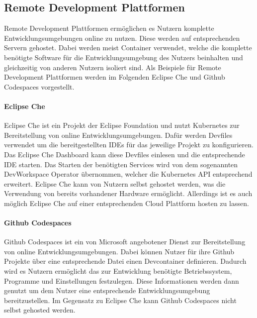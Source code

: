 \subsection{Remote Development Plattformen}\label{section:stand-der-technik:weitere-entwicklungen:remote-development-plattformen}

Remote Development Plattformen ermöglichen es Nutzern komplette Entwicklungsumgebungen online zu nutzen. Diese werden auf entsprechenden Servern gehostet. Dabei werden meist Container verwendet, welche die komplette benötigte Software für die Entwicklungsumgebung des Nutzers beinhalten und gleichzeitig von anderen Nutzern isoliert sind. Als Beispiele für Remote Development Plattformen werden im Folgenden Eclipse Che \cite{noauthor_eclipse-che_nodate} und Github Codespaces \cite{noauthor_github-codespaces_2024} vorgestellt.

\paragraph{Eclipse Che}
Eclipse Che \cite{noauthor_eclipse-che_nodate} ist ein Projekt der Eclipse Foundation \cite{milinkovich_eclipse-foundation_nodate} und nutzt Kubernetes \cite{noauthor_kubernetes_nodate} zur Bereitstellung von online Entwicklungsumgebungen. Dafür werden Devfiles \cite{noauthor_devfile_nodate} verwendet um die bereitgestellten IDEs für das jeweilige Projekt zu konfigurieren. Das Eclipse Che Dashboard kann diese Devfiles einlesen und die entsprechende IDE starten. Das Starten der benötigten Services wird von dem sogenannten DevWorkspace Operator übernommen, welcher die Kubernetes API entsprechend erweitert. Eclipse Che kann von Nutzern selbst gehostet werden, was die Verwendung von bereits vorhandener Hardware ermöglicht. Allerdings ist es auch möglich Eclipse Che auf einer entsprechenden Cloud Plattform hosten zu lassen.

\paragraph{Github Codespaces}
Github Codespaces \cite{noauthor_github-codespaces_2024} ist ein von Microsoft \cite{noauthor_microsoft_nodate} angebotener Dienst zur Bereitstellung von online Entwicklungsumgebungen. Dabei können Nutzer für ihre Github Projekte über eine entsprechende Datei einen Devcontainer \cite{noauthor_devcontainer_nodate} definieren. Dadurch wird es Nutzern ermöglicht das zur Entwicklung benötigte Betriebssystem, Programme und Einstellungen festzulegen. Diese Informationen werden dann genutzt um dem Nutzer eine entsprechende Entwicklungsumgebung bereitzustellen. Im Gegensatz zu Eclipse Che kann Github Codespaces nicht selbst gehosted werden.
